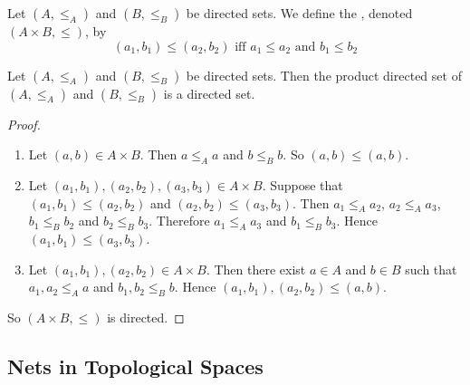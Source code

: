 \documentclass{book}
\begin{document}
	\begin{defn} 
		Let $(A, \leq_A)$ and $(B, \leq_B)$ be directed sets. We define the , denoted $(A \times B, \leq)$, by 
		$$(a_1, b_1) \leq (a_2, b_2) \text{ iff } a_1 \leq a_2 \text{ and } b_1 \leq b_2$$
	\end{defn}

	\begin{ex} 
		Let $(A, \leq_A)$ and $(B, \leq_B)$ be directed sets. Then the product directed set of $(A, \leq_A)$ and $(B, \leq_B)$ is a directed set.
	\end{ex}

	\begin{proof}\
		\begin{enumerate}
			\item Let $(a, b) \in A \times B$. Then $a \leq_A a$ and $b \leq_B b$. So $(a, b) \leq (a ,b)$.
			\item Let $(a_1, b_1), (a_2, b_2), (a_3, b_3) \in A \times B$. Suppose that $(a_1, b_1) \leq (a_2, b_2)$ and $(a_2, b_2) \leq (a_3, b_3)$. Then $a_1 \leq_A a_2$, $a_2 \leq_A a_3$, $b_1 \leq_B b_2$ and $b_2 \leq_B b_3$. Therefore $a_1 \leq_A a_3$ and $b_1 \leq_B b_3$. Hence $(a_1, b_1) \leq (a_3, b_3)$.
			\item Let $(a_1, b_1), (a_2, b_2) \in A \times B$. Then there exist $a \in A$ and $b \in B$ such that $a_1, a_2 \leq_A a$ and $b_1, b_2 \leq_B b$. Hence $(a_1, b_1), (a_2, b_2) \leq (a, b)$.
		\end{enumerate}
		So $(A \times B, \leq)$ is directed.
	\end{proof}
	
	
	
	
	
	
	
	
	
	
	
	
	
	
	
	
	
	
	
	
	
	
	
	
	
	
	
	\subsection{Nets in Topological Spaces}
	
	
\end{document}
